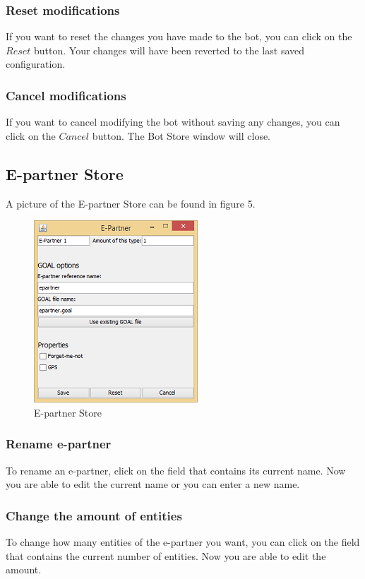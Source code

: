 \subsubsection{Reset modifications}
If you want to reset the changes you have made to the bot, you can click on the $Reset$ button. Your changes will have been reverted to the last saved configuration.

\subsubsection{Cancel modifications}
If you want to cancel modifying the bot without saving any changes, you can click on the $Cancel$ button. The Bot Store window will close.

\subsection{E-partner Store}
A picture of the E-partner Store can be found in figure 5.
\begin{figure}[h]
\begin{center}
\includegraphics{ScenarioEditor/es.png}
\end{center}
\caption{E-partner Store}
\end{figure}
\subsubsection{Rename e-partner}
To rename an e-partner, click on the field that contains its current name. Now you are able to edit the current name or you can enter a new name.

\subsubsection{Change the amount of entities}
To change how many entities of the e-partner you want, you can click on the field that contains the current number of entities. Now you are able to edit the amount.

